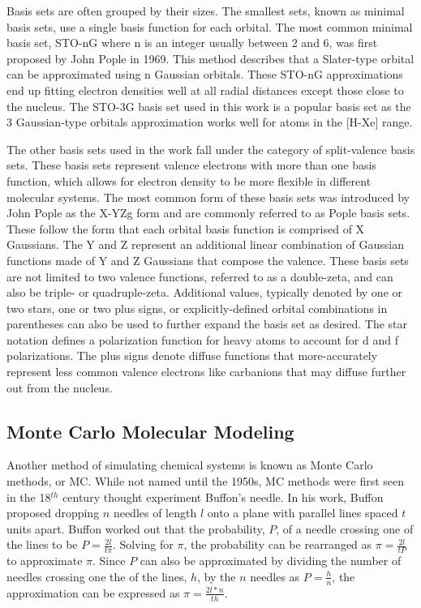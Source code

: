 Basis sets are often grouped by their sizes.
The smallest sets, known as minimal basis sets, use a single basis function for each orbital. 
The most common minimal basis set, STO-nG where n is an integer usually between 2 and 6, was first proposed by John Pople in 1969.\cite{PopleSTO}
This method describes that a Slater-type orbital can be approximated using n Gaussian orbitals.
These STO-nG approximations end up fitting electron densities well at all radial distances except those close to the nucleus.
The STO-3G basis set used in this work is a popular basis set as the 3 Gaussian-type orbitals approximation works well for atoms in the [H-Xe] range.

The other basis sets used in the work fall under the category of split-valence basis sets.
These basis sets represent valence electrons with more than one basis function, which allows for electron density to be more flexible in different molecular systems.
The most common form of these basis sets was introduced by John Pople as the X-YZg form and are commonly referred to as Pople basis sets.\cite{PopleBS}
These follow the form that each orbital basis function is comprised of X Gaussians.
The Y and Z represent an additional linear combination of Gaussian functions made of Y and Z Gaussians  that compose the valence. 
These basis sets are not limited to two valence functions, referred to as a double-zeta, and can also be triple- or quadruple-zeta.
Additional values, typically denoted by one or two stars, one or two plus signs, or explicitly-defined orbital combinations in parentheses can also be used to further expand the basis set as desired.
The star notation defines a polarization function for heavy atoms to account for d and f polarizations.
The plus signs denote diffuse functions that more-accurately represent less common valence electrons like carbanions that may diffuse further out from the nucleus.

\subsection{Monte Carlo Molecular Modeling}

Another method of simulating chemical systems is known as Monte Carlo methods, or MC.
While not named until the 1950s, MC methods were first seen in the 18$^{th}$ century thought experiment Buffon's needle.\cite{buffon}
In his work, Buffon proposed dropping $n$ needles of length $l$ onto a plane with parallel lines spaced $t$ units apart.
Buffon worked out that the probability, $P$, of a needle crossing one of the lines to be $P=\frac{2l}{t\pi}$.
Solving for $\pi$, the probability can be rearranged as $\pi=\frac{2l}{tP}$ to approximate $\pi$.
Since $P$ can also be approximated by dividing the number of needles crossing one the of the lines, $h$, by the $n$ needles as $P=\frac{h}{n}$, the approximation can be expressed as $\pi=\frac{2l*n}{th}$.

